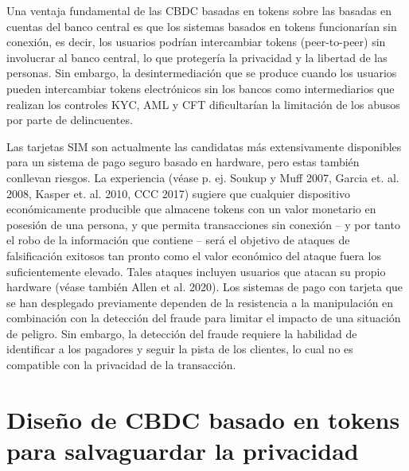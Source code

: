 \documentclass[10pt,spanish]{article}
\begin{document}
Una ventaja fundamental de las CBDC basadas en tokens sobre las basadas
en cuentas del banco central es que los sistemas basados en tokens
funcionarían sin conexión, es decir, los usuarios podrían intercambiar
tokens (peer-to-peer) sin involucrar al banco central, lo que protegería
la privacidad y la libertad de las personas. Sin embargo, la
desintermediación que se produce cuando los usuarios pueden intercambiar
tokens electrónicos sin los bancos como intermediarios que realizan los
controles KYC, AML y CFT dificultarían la limitación de los abusos por
parte de delincuentes.

Las tarjetas SIM son actualmente las candidatas más extensivamente
disponibles para un sistema de pago seguro basado en hardware, pero
estas también conllevan riesgos. La experiencia (véase p. ej. Soukup y
Muff 2007, Garcia et. al. 2008, Kasper et. al. 2010, CCC 2017) sugiere
que cualquier dispositivo económicamente producible que almacene tokens
con un valor monetario en posesión de una persona, y que permita
transacciones sin conexión -- y por tanto el robo de la información que
contiene -- será el objetivo de ataques de falsificación exitosos tan
pronto como el valor económico del ataque fuera los suficientemente
elevado. Tales ataques incluyen usuarios que atacan su propio hardware
(véase también Allen et al. 2020). Los sistemas de pago con tarjeta que
se han desplegado previamente dependen de la resistencia a la
manipulación en combinación con la detección del fraude para limitar el
impacto de una situación de peligro. Sin embargo, la detección del
fraude requiere la habilidad de identificar a los pagadores y seguir la
pista de los clientes, lo cual no es compatible con la privacidad de la
transacción.

\hypertarget{diseuxf1o-de-cbdc-basado-en-tokens-para-salvaguardar-la-privacidad}{%
\section{Diseño de CBDC basado en tokens para salvaguardar la
privacidad}
\label{4.-diseuxf1o-de-cbdc-basado-en-tokens-para-salvaguardar-la-privacidad}}
\end{document}
